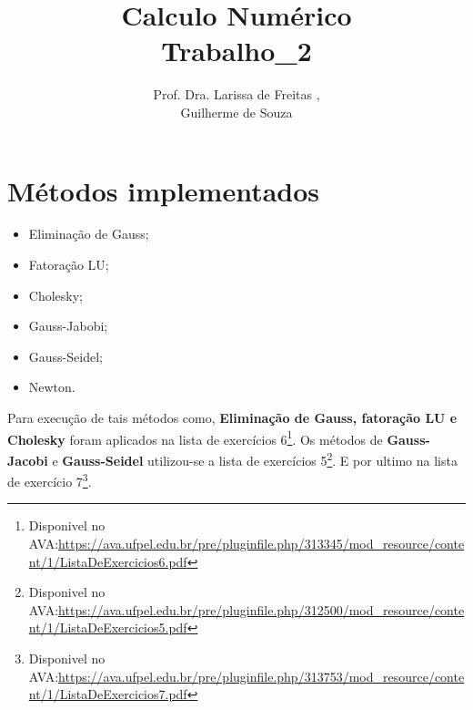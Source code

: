 \documentclass[12pt]{article}
\title{Calculo Numérico\\Trabalho\_2}
\author{Prof. Dra. Larissa de Freitas \inst{1},\\Guilherme de Souza\inst{1}}
\begin{document}
 

\maketitle
\br

\section{Métodos implementados}
\begin{itemize}
  \item Eliminação de Gauss;
  \item Fatoração LU;
  \item Cholesky;
  \item Gauss-Jabobi;
  \item Gauss-Seidel;
  \item Newton.
\end{itemize}

Para execução de tais métodos como, \textbf{Eliminação de Gauss, fatoração LU e Cholesky} foram aplicados na lista de exercícios 6\footnote{Disponivel no AVA:\url{https://ava.ufpel.edu.br/pre/pluginfile.php/313345/mod_resource/content/1/ListaDeExercicios6.pdf}}. Os métodos de \textbf{Gauss-Jacobi} e \textbf{Gauss-Seidel} utilizou-se a lista de exercícios 5\footnote{Disponivel no AVA:\url{https://ava.ufpel.edu.br/pre/pluginfile.php/312500/mod_resource/content/1/ListaDeExercicios5.pdf}}. E por ultimo na lista de exercício 7\footnote{Disponivel no AVA:\url{https://ava.ufpel.edu.br/pre/pluginfile.php/313753/mod_resource/content/1/ListaDeExercicios7.pdf}}.
\end{document}
